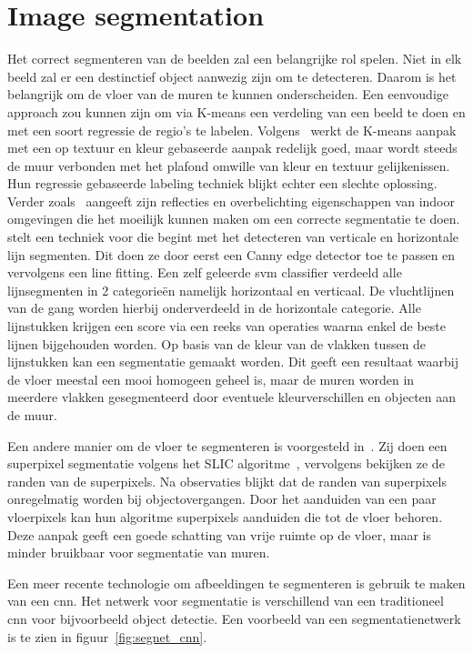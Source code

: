     \section{Image segmentation}
        Het correct segmenteren van de beelden zal een belangrijke rol spelen. Niet in elk beeld zal er een destinctief object aanwezig zijn om te detecteren. Daarom is het belangrijk om de vloer van
        de muren te kunnen onderscheiden. Een eenvoudige approach zou kunnen zijn om via K-means een verdeling van een beeld te doen en met een soort regressie de regio's te labelen. 
        Volgens~\cite{zhangwall} werkt de K-means aanpak met een op textuur en kleur gebaseerde aanpak redelijk goed, maar wordt steeds de muur verbonden met het plafond omwille van kleur en textuur gelijkenissen.
        Hun regressie gebaseerde labeling techniek blijkt echter een slechte oplossing. Verder zoals~\cite{Li2010} aangeeft zijn reflecties en overbelichting eigenschappen van indoor omgevingen die het moeilijk kunnen maken om
        een correcte segmentatie te doen.
        \cite{Li2010} stelt een techniek voor die begint met het detecteren van verticale en horizontale lijn segmenten. Dit doen ze door eerst een Canny edge detector\cite{Canny} toe te passen en vervolgens een line fitting.
        Een zelf geleerde \gls{svm} classifier verdeeld alle lijnsegmenten in 2 categorie\"{e}n namelijk horizontaal en verticaal. De vluchtlijnen van de gang worden hierbij onderverdeeld in de horizontale categorie.
        Alle lijnstukken krijgen een score via een reeks van operaties waarna enkel de beste lijnen bijgehouden worden. Op basis van de kleur van de vlakken tussen de lijnstukken kan een segmentatie gemaakt worden.
        Dit geeft een resultaat waarbij de vloer meestal een mooi homogeen geheel is, maar de muren worden in meerdere vlakken gesegmenteerd door eventuele kleurverschillen en objecten aan de muur.
        
        Een andere manier om de vloer te segmenteren is voorgesteld in~\cite{Rodriguez-Telles2013}. Zij doen een superpixel segmentatie volgens het SLIC algoritme~\cite{slic}, vervolgens bekijken ze de randen van de superpixels.
        Na observaties blijkt dat de randen van superpixels onregelmatig worden bij objectovergangen. Door het aanduiden van een paar vloerpixels kan hun algoritme superpixels aanduiden die tot de vloer behoren.
        Deze aanpak geeft een goede schatting van vrije ruimte op de vloer, maar is minder bruikbaar voor segmentatie van muren.

        Een meer recente technologie om afbeeldingen te segmenteren is gebruik te maken van een \gls{cnn}. Het netwerk voor segmentatie is verschillend van een traditioneel \gls{cnn} voor bijvoorbeeld object detectie.
        Een voorbeeld van een segmentatienetwerk is te zien in figuur~\ref{fig:segnet_cnn}.

